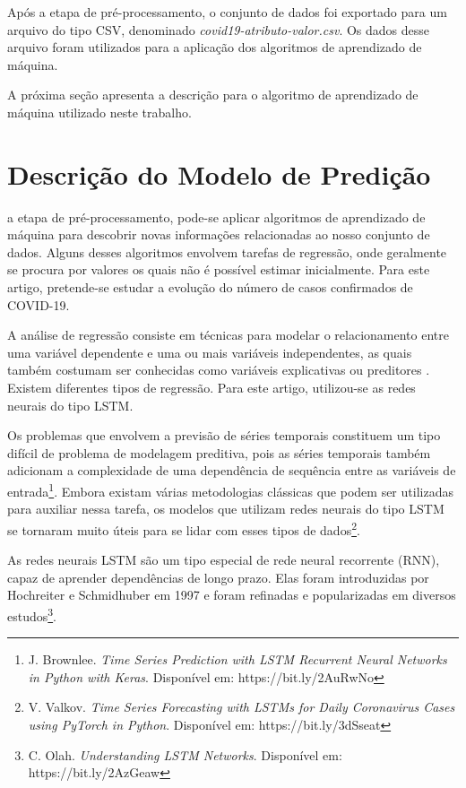 \documentclass{ieeeaccess}
\begin{document}
Após a etapa de pré-processamento, o conjunto de dados foi exportado para um arquivo do tipo CSV, denominado \textit{covid19-atributo-valor.csv}. Os dados desse arquivo foram utilizados para a aplicação dos algoritmos de aprendizado de máquina. 

A próxima seção apresenta a descrição para o algoritmo de aprendizado de máquina utilizado neste trabalho.

\section{Descrição do Modelo de Predição} 

\label{sec:introduction}  a etapa de pré-processamento, pode-se aplicar algoritmos de aprendizado de máquina para descobrir novas informações relacionadas ao nosso conjunto de dados. Alguns desses algoritmos envolvem tarefas de regressão, onde geralmente se procura por valores os quais não é possível estimar inicialmente. Para este artigo, pretende-se estudar a evolução do número de casos confirmados de COVID-19.

A análise de regressão consiste em técnicas para modelar o relacionamento entre uma variável dependente e uma ou mais variáveis independentes, as quais também costumam ser conhecidas como variáveis explicativas ou preditores \cite{b21}. Existem diferentes tipos de regressão. Para este artigo, utilizou-se as redes neurais do tipo LSTM.

Os problemas que envolvem a previsão de séries temporais constituem um tipo difícil de problema de modelagem preditiva, pois as séries temporais também adicionam a complexidade de uma dependência de sequência entre as variáveis de entrada\footnote{J. Brownlee. \textit{Time Series Prediction with LSTM Recurrent Neural Networks in Python with Keras}. Disponível em: https://bit.ly/2AuRwNo}. Embora existam várias metodologias clássicas que podem ser utilizadas para auxiliar nessa tarefa, os modelos que utilizam redes neurais do tipo LSTM se tornaram muito úteis para se lidar com esses tipos de dados\footnote{V. Valkov. \textit{Time Series Forecasting with LSTMs for Daily Coronavirus Cases using PyTorch in Python}. Disponível em: https://bit.ly/3dSseat}. 

As redes neurais LSTM são um tipo especial de rede neural recorrente (RNN), capaz de aprender dependências de longo prazo. Elas foram introduzidas por Hochreiter e Schmidhuber em 1997 e foram refinadas e popularizadas em diversos estudos\footnote{C. Olah. \textit{Understanding LSTM Networks}. Disponível em: https://bit.ly/2AzGeaw}. 
\end{document}
